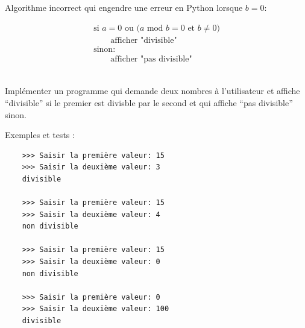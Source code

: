 \documentclass[a4paper,17pt]{extarticle}
\newenvironment{eleve}%
{\begin{activite}\color{noiramu}\\[-0.5cm]}
{\end{activite}}
\begin{document}
\begin{exemple}
Algorithme incorrect qui engendre une erreur en Python lorsque \(b=0\):

\[
\begin{array}{ll}
\text{si $a=0$ ou $\big( a$ mod $b = 0$ et $b \neq 0\big)$}\\
\qquad \text{afficher "divisible"}\\
\text{sinon:}\\
\qquad \text{afficher "pas divisible"}
\end{array}
\]

        \end{exemple}\begin{eleve}
    Implémenter un programme qui demande deux nombres à l'utilisateur et
affiche ``divisible'' si le premier est divisble par le second et qui
affiche ``pas divisible'' sinon.

Exemples et tests :

\begin{verbatim}
    >>> Saisir la première valeur: 15
    >>> Saisir la deuxième valeur: 3
    divisible

    >>> Saisir la première valeur: 15
    >>> Saisir la deuxième valeur: 4
    non divisible

    >>> Saisir la première valeur: 15
    >>> Saisir la deuxième valeur: 0
    non divisible

    >>> Saisir la première valeur: 0
    >>> Saisir la deuxième valeur: 100
    divisible
\end{verbatim}
        
        \end{eleve}

    
    
    
\end{document}
